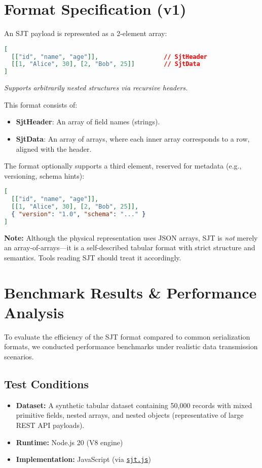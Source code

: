 \documentclass[12pt]{article}
\begin{document}
\section{Format Specification (v1)}
An SJT payload is represented as a 2-element array:

\begin{lstlisting}[language=json]
[
  [["id", "name", "age"]],                  // SjtHeader
  [[1, "Alice", 30], [2, "Bob", 25]]        // SjtData
]
\end{lstlisting}

\noindent\textit{Supports arbitrarily nested structures via recursive headers.}

This format consists of:
\begin{itemize}
  \item \textbf{SjtHeader}: An array of field names (strings).
  \item \textbf{SjtData}: An array of arrays, where each inner array corresponds to a row, aligned with the header.
\end{itemize}

The format optionally supports a third element, reserved for metadata (e.g., versioning, schema hints):

\begin{lstlisting}[language=json]
[
  [["id", "name", "age"]],
  [[1, "Alice", 30], [2, "Bob", 25]],
  { "version": "1.0", "schema": "..." }
]
\end{lstlisting}

\noindent\textbf{Note:} Although the physical representation uses JSON arrays, SJT is \textit{not} merely an array-of-arrays---it is a self-described tabular format with strict structure and semantics. Tools reading SJT should treat it accordingly.
\section{Benchmark Results \& Performance Analysis}
To evaluate the efficiency of the SJT format compared to common serialization formats, we conducted performance benchmarks under realistic data transmission scenarios.

\clearpage
\subsection*{Test Conditions}
\begin{itemize}
  \item \textbf{Dataset:} A synthetic tabular dataset containing 50{,}000 records with mixed primitive fields, nested arrays, and nested objects (representative of large REST API payloads).
  \item \textbf{Runtime:} Node.js 20 (V8 engine)
  \item \textbf{Implementation:} JavaScript (via \href{https://www.npmjs.com/package/sjt.js}{\texttt{sjt.js}})
\end{itemize}
\end{document}
